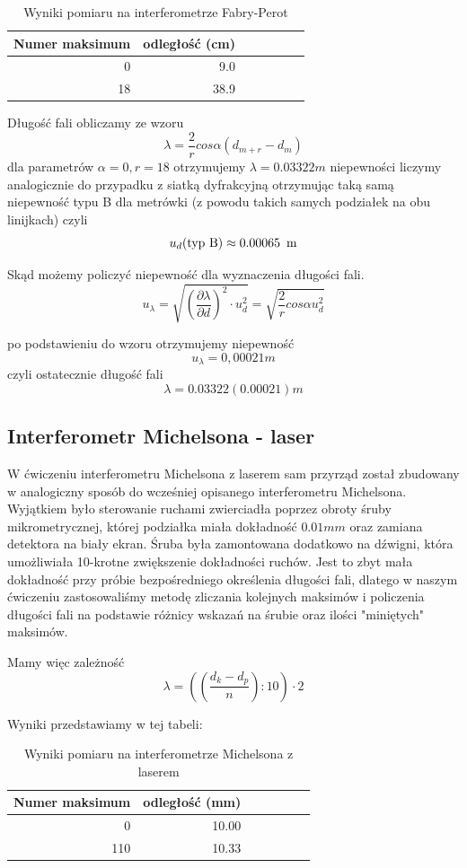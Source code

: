 \documentclass[a4paper]{article}
\newlength{\du}
\begin{document}
\begin{table}[h!]
\centering
\begin{tabular}{rrrrrrr}
\toprule
Numer maksimum & odległość (cm) \\
\midrule
0 & 9.0 \\
18 & 38.9 \\
\bottomrule
\end{tabular}
\caption{Wyniki pomiaru na interferometrze Fabry-Perot}
\label{pomiary_fabry_perot}
\end{table}

Długość fali obliczamy ze wzoru
$$\lambda = \frac{2}{r}cos \alpha (d_{m+r} - d_{m})$$
dla parametrów
$\alpha = 0, r = 18$
otrzymujemy $\lambda = 0.03322 m$
niepewności liczymy analogicznie do przypadku z siatką dyfrakcyjną otrzymując taką samą niepewność typu B dla metrówki (z powodu takich samych podziałek na obu linijkach) czyli
$$u_d (\text{typ B}) \approx 0.00065 \enskip \text{m}$$

Skąd możemy policzyć niepewność dla wyznaczenia długości fali. 
$$u_{\lambda} = \sqrt{(\frac{\partial \lambda}{\partial d})^2 \cdot u_d^2 } = \sqrt{\frac{2}{r}cos \alpha u_d^2}$$

po podstawieniu do wzoru otrzymujemy niepewność
$$u_{\lambda} = 0,00021 m$$
czyli ostatecznie długość fali $$\lambda = 0.03322(0.00021)m$$

\subsection{Interferometr Michelsona - laser}
W ćwiczeniu interferometru Michelsona z laserem sam przyrząd został zbudowany w analogiczny sposób
do wcześniej opisanego interferometru Michelsona.
Wyjątkiem było sterowanie ruchami zwierciadła poprzez obroty śruby mikrometrycznej, której podziałka
miała dokładność $0.01 mm$ oraz zamiana detektora na biały ekran.
Śruba była zamontowana dodatkowo na dźwigni, która umożliwiała 10-krotne zwiększenie dokładności ruchów.
Jest to zbyt mała dokładność przy próbie bezpośredniego określenia długości fali, dlatego w naszym ćwiczeniu
zastosowaliśmy metodę zliczania kolejnych maksimów
i policzenia długości fali na podstawie różnicy wskazań na śrubie oraz ilości "miniętych" maksimów.

Mamy więc zależność
$$\lambda = ((\frac{d_{k} - d_{p}}{n}):10) \cdot 2$$

Wyniki przedstawiamy w tej tabeli:


\begin{table}[h!]
\centering
\begin{tabular}{rrrrrrr}
\toprule
Numer maksimum & odległość (mm) \\
\midrule
0 & 10.00 \\
110 & 10.33 \\
\bottomrule
\end{tabular}
\caption{Wyniki pomiaru na interferometrze Michelsona z laserem}
\label{pomiary_michelsona_laser}
\end{table}
\end{document}

